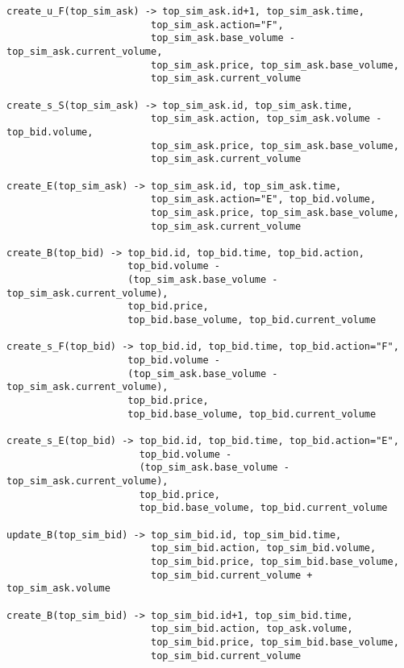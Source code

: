 \documentclass{article}
\begin{document}
\begin{verbatim}
create_u_F(top_sim_ask) -> top_sim_ask.id+1, top_sim_ask.time,
                         top_sim_ask.action="F", 
                         top_sim_ask.base_volume - top_sim_ask.current_volume, 
                         top_sim_ask.price, top_sim_ask.base_volume, 
                         top_sim_ask.current_volume
                         
create_s_S(top_sim_ask) -> top_sim_ask.id, top_sim_ask.time,
                         top_sim_ask.action, top_sim_ask.volume - top_bid.volume, 
                         top_sim_ask.price, top_sim_ask.base_volume, 
                         top_sim_ask.current_volume
                         
create_E(top_sim_ask) -> top_sim_ask.id, top_sim_ask.time,
                         top_sim_ask.action="E", top_bid.volume, 
                         top_sim_ask.price, top_sim_ask.base_volume, 
                         top_sim_ask.current_volume
                         
create_B(top_bid) -> top_bid.id, top_bid.time, top_bid.action,
                     top_bid.volume - 
                     (top_sim_ask.base_volume - top_sim_ask.current_volume),
                     top_bid.price,
                     top_bid.base_volume, top_bid.current_volume

create_s_F(top_bid) -> top_bid.id, top_bid.time, top_bid.action="F",
                     top_bid.volume - 
                     (top_sim_ask.base_volume - top_sim_ask.current_volume),
                     top_bid.price,
                     top_bid.base_volume, top_bid.current_volume
                        
create_s_E(top_bid) -> top_bid.id, top_bid.time, top_bid.action="E",
                       top_bid.volume - 
                       (top_sim_ask.base_volume - top_sim_ask.current_volume),
                       top_bid.price,
                       top_bid.base_volume, top_bid.current_volume
                     
update_B(top_sim_bid) -> top_sim_bid.id, top_sim_bid.time,
                         top_sim_bid.action, top_sim_bid.volume,
                         top_sim_bid.price, top_sim_bid.base_volume, 
                         top_sim_bid.current_volume + top_sim_ask.volume
                         
create_B(top_sim_bid) -> top_sim_bid.id+1, top_sim_bid.time,
                         top_sim_bid.action, top_ask.volume,
                         top_sim_bid.price, top_sim_bid.base_volume, 
                         top_sim_bid.current_volume
                         

\end{verbatim}
\end{document}
